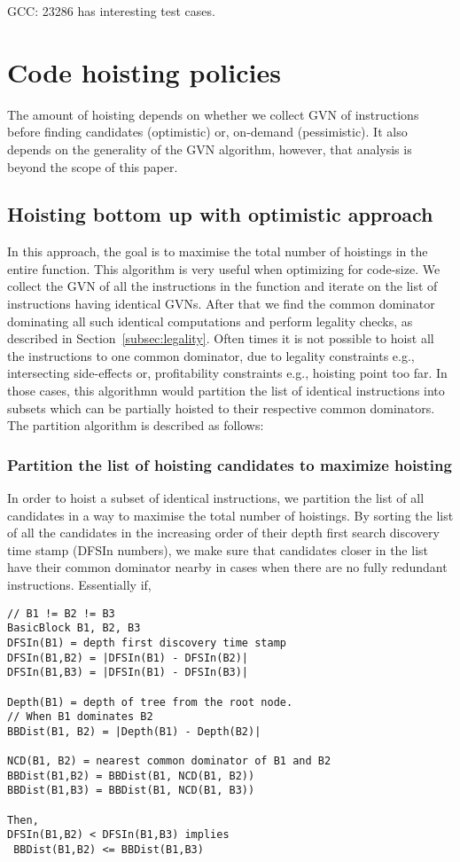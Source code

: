 \documentclass{sig-alternate}
\begin{document}
GCC: 23286 has interesting test cases.

\section{Code hoisting policies}
The amount of hoisting depends on whether we collect GVN of instructions
before finding candidates (optimistic) or, on-demand (pessimistic). It also
depends on the generality of the GVN algorithm, however, that analysis is beyond
the scope of this paper.

\subsection{Hoisting bottom up with optimistic approach}
\label{subsec:optimistic}
In this approach, the goal is to maximise the total number of hoistings in the
entire function.  This algorithm is very useful when optimizing for code-size.
We collect the GVN of all the instructions in the function and iterate on the
list of instructions having identical GVNs. After that we find the common
dominator dominating all such identical computations and perform legality
checks, as described in Section~\ref{subsec:legality}. Often times it is not
possible to hoist all the instructions to one common dominator, due to legality
constraints e.g., intersecting side-effects or, profitability constraints e.g.,
hoisting point too far. In those cases, this algorithmn would partition the list
of identical instructions into subsets which can be partially hoisted to their
respective common dominators. The partition algorithm is described as follows:

\subsubsection{Partition the list of hoisting candidates to maximize hoisting}
\label{subsec:partition}
In order to hoist a subset of identical instructions, we partition the list of
all candidates in a way to maximise the total number of hoistings.  By sorting
the list of all the candidates in the increasing order of their depth first
search discovery time stamp \cite{clrs} (DFSIn numbers), we make sure that
candidates closer in the list have their common dominator nearby in cases when
there are no fully redundant instructions. Essentially if,

\begin{verbatim}
// B1 != B2 != B3
BasicBlock B1, B2, B3
DFSIn(B1) = depth first discovery time stamp
DFSIn(B1,B2) = |DFSIn(B1) - DFSIn(B2)|
DFSIn(B1,B3) = |DFSIn(B1) - DFSIn(B3)|

Depth(B1) = depth of tree from the root node.
// When B1 dominates B2
BBDist(B1, B2) = |Depth(B1) - Depth(B2)|

NCD(B1, B2) = nearest common dominator of B1 and B2
BBDist(B1,B2) = BBDist(B1, NCD(B1, B2))
BBDist(B1,B3) = BBDist(B1, NCD(B1, B3))

Then,
DFSIn(B1,B2) < DFSIn(B1,B3) implies
 BBDist(B1,B2) <= BBDist(B1,B3)
\end{verbatim}
\end{document}

